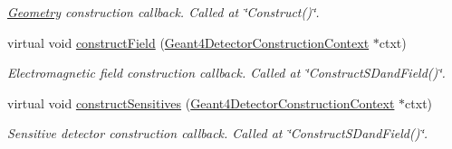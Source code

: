 \begin{DoxyCompactItemize}
\begin{DoxyCompactList}\small\item\em \hyperlink{namespace_d_d4hep_1_1_geometry}{Geometry} construction callback. Called at \char`\"{}Construct()\char`\"{}. \item\end{DoxyCompactList}\item 
virtual void \hyperlink{class_d_d4hep_1_1_simulation_1_1_geant4_detector_construction_sequence_a74d488648a50cae0230ca9dedf678160}{constructField} (\hyperlink{class_d_d4hep_1_1_simulation_1_1_geant4_detector_construction_context}{Geant4DetectorConstructionContext} $\ast$ctxt)
\begin{DoxyCompactList}\small\item\em Electromagnetic field construction callback. Called at \char`\"{}ConstructSDandField()\char`\"{}. \item\end{DoxyCompactList}\item 
virtual void \hyperlink{class_d_d4hep_1_1_simulation_1_1_geant4_detector_construction_sequence_ab242c91f95283ed32133f48f2bc573fa}{constructSensitives} (\hyperlink{class_d_d4hep_1_1_simulation_1_1_geant4_detector_construction_context}{Geant4DetectorConstructionContext} $\ast$ctxt)
\begin{DoxyCompactList}\small\item\em Sensitive detector construction callback. Called at \char`\"{}ConstructSDandField()\char`\"{}. \item\end{DoxyCompactList}\end{DoxyCompactItemize}
